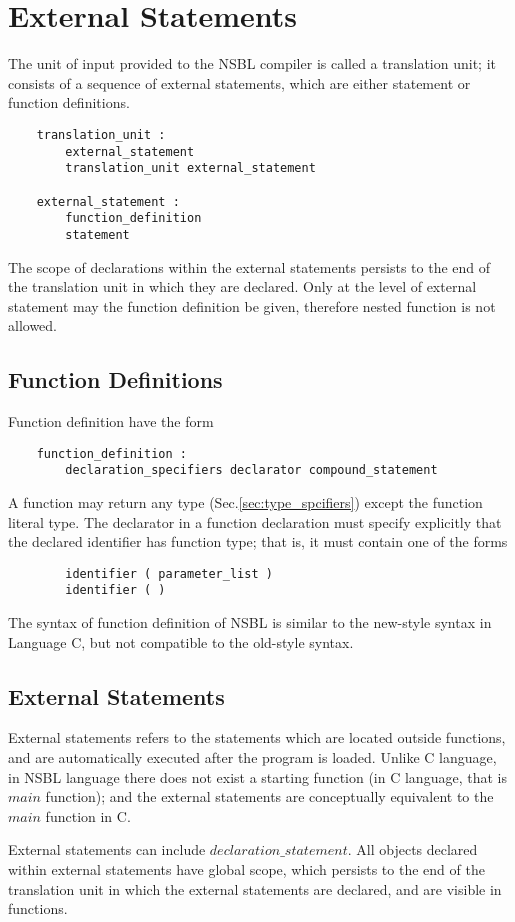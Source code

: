 \documentclass[letterpaper,12pt]{article}
\begin{document}
\section{External Statements}
The unit of input provided to the NSBL compiler is called a translation unit; it consists of a sequence of external statements, which are either statement or function definitions.
\begin{lstlisting}
	translation_unit :
		external_statement
		translation_unit external_statement

	external_statement :
		function_definition
		statement
\end{lstlisting}
The scope of declarations within the external statements persists to the end of the translation unit in which they are declared. Only at the level of external statement may the function definition be given, therefore nested function is not allowed.

\subsection{Function Definitions}
Function definition have the form
\begin{lstlisting}
	function_definition :
		declaration_specifiers declarator compound_statement
\end{lstlisting}
A function may return any type (Sec.\ref{sec:type_spcifiers}) except the function literal type. The declarator in a function declaration must specify explicitly that the declared identifier has function type; that is, it must contain one of the forms
\begin{lstlisting}
		identifier ( parameter_list )
		identifier ( )
\end{lstlisting}
The syntax of function definition of NSBL is similar to the new-style syntax in Language C, but not compatible to the old-style syntax.

\subsection{External Statements}
External statements refers to the statements which are located outside functions, and are automatically executed after the program is loaded. Unlike C language, in NSBL language there does not exist a starting function (in C language, that is $main$ function); and the external statements are conceptually equivalent to the $main$ function in C. \newline 

External statements can include $declaration\_statement$.
All objects declared within external statements have global scope, which persists to the end of the translation unit in which the external statements are declared, and are visible in functions. \newline
\end{document}
